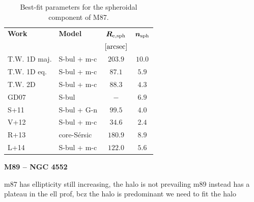 \documentclass[preprint2]{emulateapj}
\begin{document}
  \begin{table}[h]
  \small
  \caption{Best-fit parameters for the spheroidal component of M87.}
  \begin{center}
  \begin{tabular}{llcc}
  \hline
  {\bf Work} & {\bf Model}   & $\bm R_{\rm e,sph}$    & $\bm n_{\rm sph}$ \\
    &  &  $[\rm arcsec]$ & \\
  \hline
  T.W. 1D maj. & S-bul + m-c  & $203.9$  &  $10.0$ \\
  T.W. 1D eq.  & S-bul + m-c  & $87.1$   &  $5.9$ \\
  T.W. 2D      & S-bul + m-c  & $88.3$   &  $4.3$ \\
  \hline
  GD07      & S-bul	    & $-$     &  $6.9$ \\
  S+11      & S-bul + G-n   & $99.5$  &  $4.0$ \\
  V+12      & S-bul + m-c   & $34.6$  &  $2.4$ \\
  R+13      & core-S\'ersic & $180.9$ &  $8.9$ \\
  L+14      & S-bul + m-c   & $122.0$ &  $5.6$ \\
  \hline
  \end{tabular}
  \end{center}
  \label{tab:m87}
  \end{table}



  \clearpage\newpage\noindent

  {\bf M89 -- NGC 4552 \\}

  m87 has ellipticity still increasing, the halo is not prevailing
  m89 instead has a plateau in the ell prof, bcz the halo is predominant
  we need to fit the halo
\end{document}
